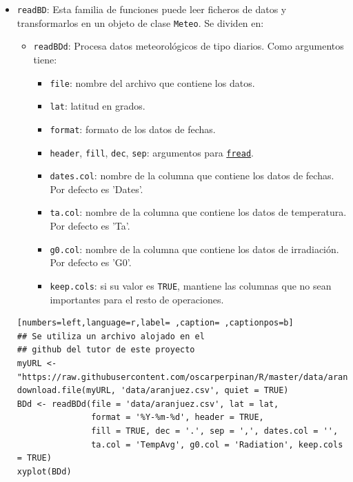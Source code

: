 \begin{itemize}
\item \texttt{readBD}: Esta familia de funciones puede leer ficheros de datos y transformarlos en un objeto de clase \texttt{Meteo}. Se dividen en:
\begin{itemize}
\item \texttt{readBDd}: Procesa datos meteorológicos de tipo diarios.
Como argumentos tiene:
\begin{itemize}
\item \texttt{file}: nombre del archivo que contiene los datos.
\item \texttt{lat}: latitud en grados.
\item \texttt{format}: formato de los datos de fechas.
\item \texttt{header}, \texttt{fill}, \texttt{dec}, \texttt{sep}: argumentos para \href{https://search.r-project.org/CRAN/refmans/data.table/html/fread.html}{\texttt{fread}}.
\item \texttt{dates.col}: nombre de la columna que contiene los datos de fechas. Por defecto es 'Dates'.
\item \texttt{ta.col}: nombre de la columna que contiene los datos de temperatura. Por defecto es 'Ta'.
\item \texttt{g0.col}: nombre de la columna que contiene los datos de irradiación. Por defecto es 'G0'.
\item \texttt{keep.cols}: si su valor es \texttt{TRUE}, mantiene las columnas que no sean importantes para el resto de operaciones.
\end{itemize}
\end{itemize}
\begin{lstlisting}[numbers=left,language=r,label= ,caption= ,captionpos=b]
## Se utiliza un archivo alojado en el
## github del tutor de este proyecto 
myURL <-"https://raw.githubusercontent.com/oscarperpinan/R/master/data/aranjuez.csv"
download.file(myURL, 'data/aranjuez.csv', quiet = TRUE)
BDd <- readBDd(file = 'data/aranjuez.csv', lat = lat,
               format = '%Y-%m-%d', header = TRUE,
               fill = TRUE, dec = '.', sep = ',', dates.col = '',
               ta.col = 'TempAvg', g0.col = 'Radiation', keep.cols = TRUE)
xyplot(BDd)
\end{lstlisting}


\end{itemize}
